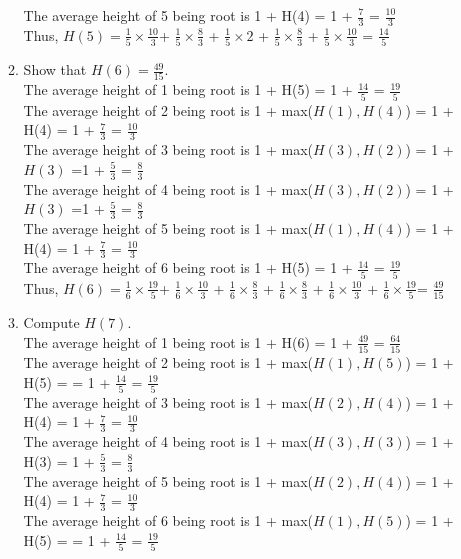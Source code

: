 \documentclass{assignment-263}
\begin{document}
\begin{enumerate}
\begin{enumerate}
      The average height of 5 being root is 1 + H(4) = 1 + $\frac{7}{3}$ = $\frac{10}{3}$ \\
      Thus, $H(5) = \frac{1}{5} \times \frac{10}{3} $+ $\frac{1}{5} \times \frac{8}{3}$ + $\frac{1}{5} \times 2$ + $ \frac{1}{5} \times \frac{8}{3}$ + $\frac{1}{5} \times \frac{10}{3} $ = $\frac{14}{5}$
  \item Show that $H(6) = \frac{49}{15}$.\\
      The average height of 1 being root is 1 + H(5) = 1 + $\frac{14}{5}$ = $\frac{19}{5}$ \\
      The average height of 2 being root is 1 + max($H(1), H(4)$) = 1 + H(4) = 1 + $\frac{7}{3}$ = $\frac{10}{3}$ \\
      The average height of 3 being root is 1 + max($H(3), H(2)$) = 1 + $H(3)$ =1 + $\frac{5}{3}$ = $\frac{8}{3}$\\
      The average height of 4 being root is 1 + max($H(3), H(2)$) = 1 + $H(3)$ =1 + $\frac{5}{3}$ = $\frac{8}{3}$\\
      The average height of 5 being root is 1 + max($H(1), H(4)$) = 1 + H(4) = 1 + $\frac{7}{3}$ = $\frac{10}{3}$ \\
      The average height of 6 being root is 1 + H(5) = 1 + $\frac{14}{5}$ = $\frac{19}{5}$ \\ 
      Thus, $H(6) = \frac{1}{6} \times \frac{19}{5} $+ $\frac{1}{6} \times \frac{10}{3}$ + $\frac{1}{6} \times \frac{8}{3}$ + $ \frac{1}{6} \times \frac{8}{3}$ + $\frac{1}{6} \times \frac{10}{3} $  + $\frac{1}{6} \times \frac{19}{5} $= $\frac{49}{15}$
  \item  Compute $H(7)$.\\ 
      The average height of 1 being root is 1 + H(6) = 1 + $\frac{49}{15}$ = $\frac{64}{15}$ \\
      The average height of 2 being root is 1 + max($H(1), H(5)$) = 1 + H(5) = = 1 + $\frac{14}{5}$ = $\frac{19}{5}$\\
      The average height of 3 being root is 1 + max($H(2), H(4)$) = 1 + H(4) = 1 + $\frac{7}{3}$ = $\frac{10}{3}$ \\
      The average height of 4 being root is 1 + max($H(3), H(3)$) = 1 + H(3) = 1 + $\frac{5}{3}$ = $\frac{8}{3}$\\
      The average height of 5 being root is 1 + max($H(2), H(4)$) = 1 + H(4) = 1 + $\frac{7}{3}$ = $\frac{10}{3}$ \\
      The average height of 6 being root is 1 + max($H(1), H(5)$) = 1 + H(5) = = 1 + $\frac{14}{5}$ = $\frac{19}{5}$\\

\end{enumerate}
\end{enumerate}
\end{document}
